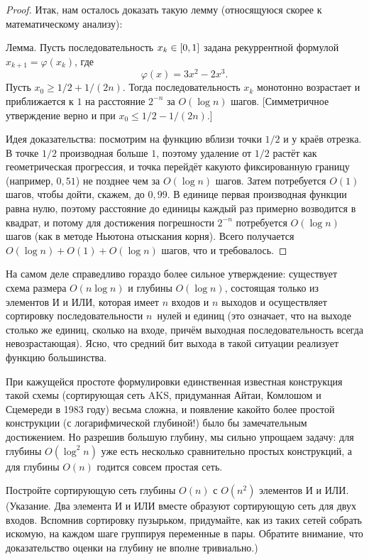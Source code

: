 \begin{proof}
Итак, нам осталось доказать такую лемму (относящуюся скорее
к математическому анализу):

\textsf{Лемма}.
Пусть последовательность $x_k\hm\in[0,1]$ задана рекуррентной формулой
$x_{k+1}=\varphi(x_k)$, где
        $$
\varphi(x)=3x^2-2x^3.
        $$
Пусть $x_0\ge1/2+1/(2n)$. Тогда
последовательность $x_k$ монотонно возрастает и приближается
к $1$ на расстояние $2^{-n}$ за $O(\log n)$ шагов. [Симметричное
утверждение верно и при $x_0\le 1/2-1/(2n)$.]

Идея доказательства: посмотрим на функцию вблизи
точки $1/2$ и у краёв отрезка. В точке $1/2$ производная больше
$1$, поэтому удаление от $1/2$ растёт как геометрическая
прогрессия, и точка перейдёт какую\д то фиксированную границу
(например, $0{,}51$) не позднее чем за $O(\log n)$ шагов. Затем
потребуется $O(1)$ шагов, чтобы дойти, скажем, до $0{,}99$. В
единице первая производная функции равна нулю, поэтому
расстояние до единицы каждый раз примерно возводится в квадрат,
и потому для достижения погрешности $2^{-n}$ потребуется $O(\log
n)$ шагов (как в методе Ньютона отыскания корня). Всего
получается $O(\log n)+O(1)+O(\log n)$ шагов, что и требовалось.
\end{proof}

На самом деле справедливо гораздо более сильное утверждение:
существует схема размера $O(n\log n)$ и глубины $O(\log n)$,
состоящая только из элементов И и ИЛИ, которая имеет $n$ входов
и $n$ выходов и осуществляет сортировку последовательности
$n$~нулей и единиц (это означает, что на выходе столько же
единиц, сколько на входе, причём выходная последовательность
всегда невозрастающая). Ясно, что средний бит выхода в такой
ситуации реализует функцию большинства.

При кажущейся простоте формулировки единственная известная
конструкция такой схемы (сортирующая сеть AKS, придуманная
Айтаи,%
Комлошом%
и Сцемереди%
в 1983 году)
весьма сложна, и появление какой\д то более простой конструкции
(с логарифмической глубиной!) было бы замечательным достижением. Но разрешив большую глубину, мы сильно упрощаем задачу: для глубины $O(\log^2 n)$ уже есть несколько сравнительно простых конструкций, а для глубины $O(n)$ годится совсем простая сеть.

\begin{problem}
Постройте сортирующую сеть глубины $O(n)$ с $O(n^2)$ элементов И и ИЛИ.  (Указание. Два элемента И и ИЛИ вместе образуют сортирующую сеть для двух входов. Вспомнив сортировку пузырьком, придумайте, как из таких сетей собрать искомую, на каждом шаге группируя переменные в пары. Обратите внимание, что доказательство оценки на глубину не вполне тривиально.)
\end{problem}

